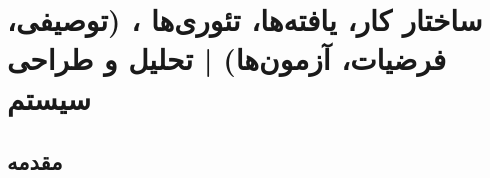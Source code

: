 \chapter{ساختار کار، یافته‌ها، تئوری‌ها ، (توصیفی، فرضیات،  آزمون‌ها) | تحلیل و طراحی سیستم}
\section*{مقدمه}
